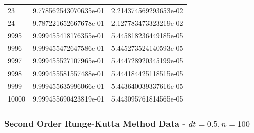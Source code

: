\documentclass[pdf,color]{UoBnote}
\begin{document}
\begin{table}[H]
{\begin{tabular}{l|l|l}
    23    & 9.778562543070635e-01 & 2.214374569293653e-02 \\
    24    & 9.787221652667678e-01 & 2.127783473323219e-02 \\
    \hline\hline
    9995  & 9.999455418176355e-01 & 5.445818236449185e-05 \\
    9996  & 9.999455472647586e-01 & 5.445273524140593e-05 \\
    9997  & 9.999455527107965e-01 & 5.444728920345199e-05 \\
    9998  & 9.999455581557488e-01 & 5.444184425118515e-05 \\
    9999  & 9.999455635996066e-01 & 5.443640039337616e-05 \\
    10000 & 9.999455690423819e-01 & 5.443095761814565e-05 \\
    \end{tabular}}
\end{table}

\subsubsection{Second Order Runge-Kutta Method Data - $dt = 0.5, n = 100$}
\end{document}

